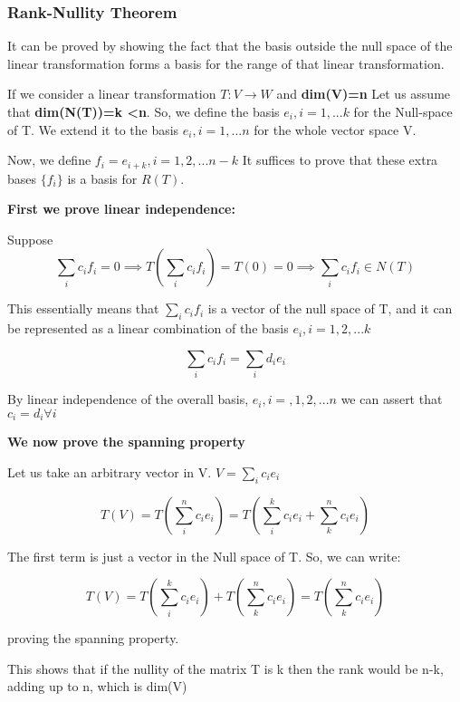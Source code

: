 \subsubsection{Rank-Nullity Theorem}

It can be proved by showing the fact that the basis outside the null space of the linear transformation forms a basis for the range of that linear transformation.

If we consider a linear transformation $T : V \to W$
and \textbf{dim(V)=n} Let us assume that \textbf{dim(N(T))=k <n}. So, we define the basis $e_i, i=1,...k$ for the Null-space of T. We extend it to the basis $e_i, i=1, ...n$ for the whole vector space V.

Now, we define $f_i=e_{i+k} , i = 1, 2, ...n-k$
It suffices to prove that these extra bases $\{f_i\}$ is a basis for $R(T)$.

\textbf{First we prove linear independence:}

Suppose $$\sum_i c_i f_i= 0 \implies T(\sum_i c_i f_i)=T(0)=0 \implies \sum_i c_i f_i \in N(T)$$

This essentially means that $\sum_i c_i f_i$ is a vector of the null space of T, and it can be represented as a linear combination of the basis $e_i , i=1, 2,...k$

$$\sum_i c_i f_i = \sum_id_i e_i$$

By linear independence of the overall basis, $e_i , i=,1,2,...n$ we can assert that $c_i=d_i \forall i$


\textbf{We now prove the spanning property}

Let us take an arbitrary vector in V. 
$V=\sum_i c_i e_i$

$$T(V)= T (\sum_i^n c_i e_i) = T (\sum_i^k c_i e_i + \sum_k^n c_i e_i)$$

The first term is just a vector in the Null space of T. So, we can write:

$$T(V) = T(\sum_i^k c_i e_i) + T(\sum_{k}^n c_i e_i) = T(\sum_{k}^n c_i e_i)$$

proving the spanning property. 


\begin{outline}
This shows that if the nullity of the matrix T is k then the rank would be n-k, adding up to n, which is dim(V)
\end{outline}

 
